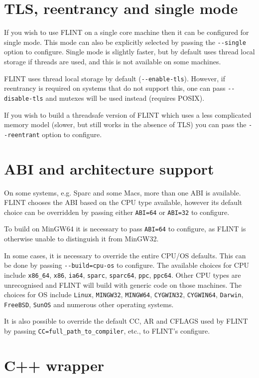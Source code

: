 \documentclass[a4paper,10pt]{book}
\newcommand{\code}{\lstinline}
\begin{document}
\chapter{TLS, reentrancy and single mode}

If you wish to use FLINT on a single core machine then it can be
configured for single mode. This mode can also be explicitly selected
by passing the \code{--single} option to configure. Single mode is
slightly faster, but by default uses thread local storage if threads
are used, and this is not available on some machines. 

FLINT uses thread local storage by default (\code{--enable-tls}).
However, if reentrancy is required on systems that do not support
this, one can pass \code{--disable-tls} and mutexes will be used
instead (requires POSIX).

If you wish to build a threadsafe version of FLINT which uses a
less complicated memory model (slower, but still works in the absence
of TLS) you can pass the \code{--reentrant} option to configure. 

\chapter{ABI and architecture support}

On some systems, e.g. Sparc and some Macs, more than one ABI is
available. FLINT chooses the ABI based on the CPU type available,
however its default choice can be overridden by passing either
\code{ABI=64} or \code{ABI=32} to configure.

To build on MinGW64 it is necessary to pass \code{ABI=64} to
configure, as FLINT is otherwise unable to distinguish it from
MinGW32.

In some cases, it is necessary to override the entire CPU/OS
defaults. This can be done by passing \code{--build=cpu-os} to
configure. The available choices for CPU include \code{x86_64},
\code{x86}, \code{ia64}, \code{sparc}, \code{sparc64}, \code{ppc},
\code{ppc64}. Other CPU types are unrecognised and FLINT will
build with generic code on those machines. The choices for OS
include \code{Linux}, \code{MINGW32}, \code{MINGW64},
\code{CYGWIN32}, \code{CYGWIN64}, \code{Darwin}, \code{FreeBSD},
\code{SunOS} and numerous other operating systems.

It is also possible to override the default CC, AR and CFLAGS used
by FLINT by passing \code{CC=full_path_to_compiler}, etc., to
FLINT's configure.

\chapter{C++ wrapper}
\end{document}
